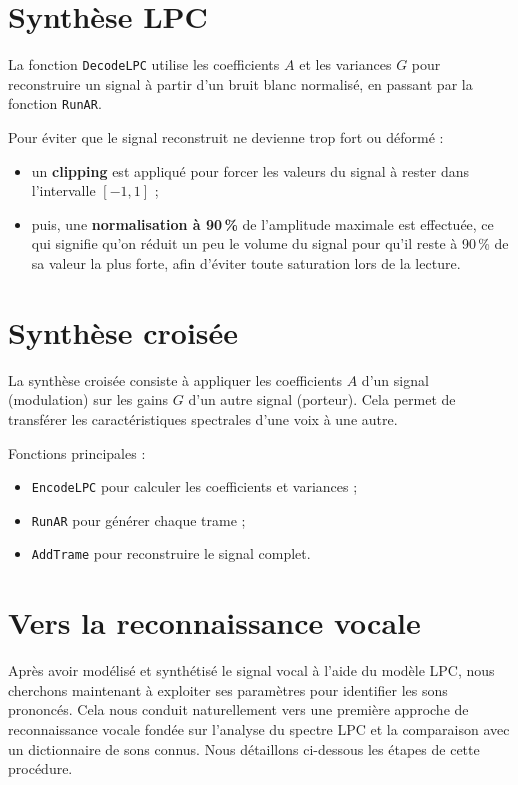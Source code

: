 \documentclass[11pt]{article}
\begin{document}
\section{Synthèse LPC}

La fonction \texttt{DecodeLPC} utilise les coefficients $A$ et les variances $G$ pour reconstruire un signal à partir d'un bruit blanc normalisé, en passant par la fonction \texttt{RunAR}. 

Pour éviter que le signal reconstruit ne devienne trop fort ou déformé :
\begin{itemize}
  \item un \textbf{clipping} est appliqué pour forcer les valeurs du signal à rester dans l’intervalle $[-1, 1]$ ;
  \item puis, une \textbf{normalisation à 90\,\%} de l’amplitude maximale est effectuée, ce qui signifie qu’on réduit un peu le volume du signal pour qu’il reste à 90\,\% de sa valeur la plus forte, afin d’éviter toute saturation lors de la lecture.
\end{itemize}

\section{Synthèse croisée}

La synthèse croisée consiste à appliquer les coefficients \( A \) d’un signal (modulation) sur les gains \( G \) d’un autre signal (porteur). Cela permet de transférer les caractéristiques spectrales d’une voix à une autre.

Fonctions principales :
\begin{itemize}
    \item \texttt{EncodeLPC} pour calculer les coefficients et variances ;
    \item \texttt{RunAR} pour générer chaque trame ;
    \item \texttt{AddTrame} pour reconstruire le signal complet.
\end{itemize}

\section{Vers la reconnaissance vocale}

Après avoir modélisé et synthétisé le signal vocal à l’aide du modèle LPC, nous cherchons maintenant à exploiter ses paramètres pour identifier les sons prononcés. Cela nous conduit naturellement vers une première approche de reconnaissance vocale fondée sur l’analyse du spectre LPC et la comparaison avec un dictionnaire de sons connus.  Nous détaillons ci-dessous les étapes de cette procédure.
\end{document}
